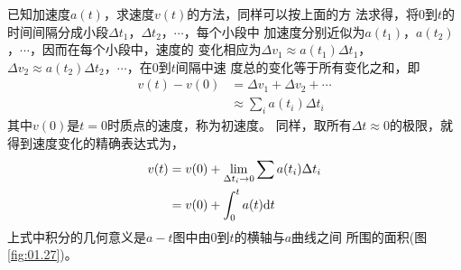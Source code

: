     已知加速度$a(t)$，求速度$v(t)$的方法，同样可以按上面的方
法求得，将0到$t$的时间间隔分成小段$\Delta t_1$，$\Delta t_2$，$\cdots$，每个小段中
加速度分别近似为$a(t_1)$，$a(t_2)$，$\cdots$，因而在每个小段中，速度的
变化相应为$\Delta v_1\approx a(t_1)\Delta t_1$，$\Delta v_2\approx a(t_2)\Delta t_2$，$\cdots$，在0到$t$间隔中速
度总的变化等于所有变化之和，即
\begin{equation}\label{eqn:01.11.05}
    \begin{aligned}
        v(t)-v(0) &=\Delta v_{1}+\Delta v_{2}+\cdots \\
        & \approx \sum_{i} a\left(t_{i}\right) \Delta t_{i}
    \end{aligned}
\end{equation}
其中$v(0)$是$t=0$时质点的速度，称为初速度。
同样，取所有$\Delta t\approx 0$的极限，就得到速度变化的精确表达式为，
\begin{equation}\label{eqn:01.11.06}
    \begin{aligned}
        v(t) &=v(0)+\lim _{\Delta t_{i} \rightarrow 0} \sum a(t_{i}) \Delta t_{i} \\
        &=v(0)+\int_{0}^{t} a(t) {\rm d}  t
    \end{aligned}
\end{equation}
上式中积分的几何意义是$a-t$图中由0到$t$的横轴与$a$曲线之间
所围的面积(图\ref{fig:01.27})。

